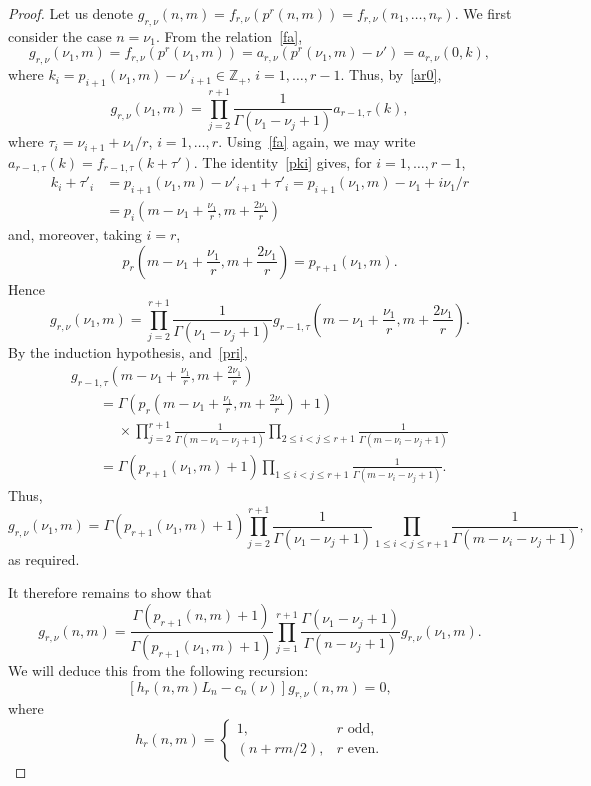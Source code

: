 \documentclass[pdftex]{sigma}
\theoremstyle{definition}
\newcommand\Z{{\mathbb Z}}
\begin{document}
\begin{proof}
Let us denote
$g_{r,\nu}(n,m)=f_{r,\nu}(p^r(n,m))=f_{r,\nu}(n_1,\dots,n_r)$.
We first consider the case $n=\nu_1$. From the relation~\eqref{fa},
\[g_{r,\nu}(\nu_1,m) = f_{r,\nu}(p^r(\nu_1,m)) = a_{r,\nu}(p^r(\nu_1,m)-\nu') = a_{r,\nu}(0,k),\]
where $k_i = p_{i+1}(\nu_1,m)-\nu'_{i+1} \in\Z_+$, $i=1,\dots,r-1$. Thus, by~\eqref{ar0},
\[g_{r,\nu}(\nu_1,m) = \prod_{j=2}^{r+1} \frac{1}{\Gamma(\nu_1-\nu_j+1)} a_{r-1,\tau}(k),\]
where $\tau_i=\nu_{i+1}+\nu_1/r$, $i=1,\dots,r$. Using~\eqref{fa} again, we may write
$a_{r-1,\tau}(k) = f_{r-1,\tau}(k+\tau')$.
The identity~\eqref{pki} gives, for $i=1,\dots,r-1$,
\begin{align*}
 k_i+\tau'_i &= p_{i+1}(\nu_1,m)-\nu'_{i+1} +\tau'_i = p_{i+1}(\nu_1,m) - \nu_1 + i\nu_1/r \\
&= p_i\left(m-\nu_1+\frac{\nu_1}{r},m+\frac{2\nu_1}{r}\right)
\end{align*}
and, moreover, taking $i=r$,
\begin{equation}\label{pri} p_{r}\left(m-\nu_1+\frac{\nu_1}{r},m+\frac{2\nu_1}{r}\right) = p_{r+1}(\nu_1,m).\end{equation}
Hence
\[g_{r,\nu}(\nu_1,m) = \prod_{j=2}^{r+1} \frac{1}{\Gamma(\nu_1-\nu_j+1)} g_{r-1,\tau}\left(m-\nu_1+\frac{\nu_1}{r},m+\frac{2\nu_1}{r}\right).\]
By the induction hypothesis, and~\eqref{pri},
\begin{gather*}
 g_{r-1,\tau}\left(m-\nu_1+\frac{\nu_1}{r},m+\frac{2\nu_1}{r}\right)\\
\qquad= \Gamma\left(p_{r}\left(m-\nu_1+\frac{\nu_1}{r},m+\frac{2\nu_1}{r}\right)+1\right)\\
\phantom{\qquad= }{}\times
 \prod_{j=2}^{r+1} \frac1{\Gamma(m-\nu_1-\nu_j+1) }\prod_{2\le i<j\le r+1} \frac1{\Gamma(m-\nu_i-\nu_j+1)} \\
\qquad= \Gamma\left(p_{r+1}(\nu_1,m)+1\right) \prod_{1\le i<j\le r+1} \frac1{\Gamma(m-\nu_i-\nu_j+1)}.
\end{gather*}
Thus,
\[g_{r,\nu}(\nu_1,m) = \Gamma\left(p_{r+1}(\nu_1,m)+1\right) \prod_{j=2}^{r+1} \frac{1}{\Gamma(\nu_1-\nu_j+1)} \prod_{1\le i<j\le r+1} \frac1{\Gamma(m-\nu_i-\nu_j+1)},\]
as required.

It therefore remains to show that
\[
g_{r,\nu}(n,m) = \frac{\Gamma(p_{r+1}(n,m)+1)}{\Gamma(p_{r+1}(\nu_1,m)+1)}
\prod_{j=1}^{r+1} \frac{\Gamma(\nu_1-\nu_j+1)}{\Gamma(n-\nu_j+1)} g_{r,\nu}(\nu_1,m).
\]
We will deduce this from the following recursion:
\begin{equation}\label{rec-alpha}[h_r(n,m) L_n - c_n(\nu)] g_{r,\nu}(n,m) = 0,\end{equation}
where
\[h_r(n,m)=\begin{cases}
1 ,& r \mbox{ odd},\\
(n+rm/2), & r \mbox{ even}.\end{cases}\]


\end{proof}
\end{document}

